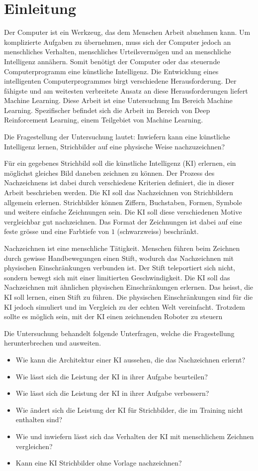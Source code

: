 
\chapter{Einleitung}\label{chap:einleit} Der Computer ist ein Werkzeug, das dem
Menschen Arbeit abnehmen kann. Um komplizierte Aufgaben zu übernehmen, muss sich
der Computer jedoch an menschliches Verhalten, menschliches Urteilsvermögen und
an menschliche Intelligenz annähern. Somit benötigt der Computer oder das
steuernde Computerprogramm eine künstliche Intelligenz. Die Entwicklung eines
intelligenten Computerprogrammes birgt verschiedene Herausforderung. Der
fähigste und am weitesten verbreitete Ansatz an diese Herausforderungen liefert
Machine Learning. Diese Arbeit ist eine Untersuchung Im Bereich Machine
Learning. Spezifischer befindet sich die Arbeit im Bereich von Deep Reinforcement
Learning, einem Teilgebiet von Machine Learning.
 
Die Fragestellung der Untersuchung lautet: Inwiefern kann eine künstliche
Intelligenz lernen, Strichbilder auf eine physische Weise nachzuzeichnen?

Für ein gegebenes Strichbild soll die künstliche Intelligenz (KI) erlernen, ein
möglichst gleiches Bild daneben zeichnen zu können. Der Prozess des
Nachzeichnens ist dabei durch verschiedene Kriterien definiert, die in dieser
Arbeit beschrieben werden. Die KI soll das Nachzeichnen von Strichbildern
allgemein erlernen. Strichbilder können Ziffern, Buchstaben, Formen, Symbole und
weitere einfache Zeichnungen sein. Die KI soll diese verschiedenen Motive
vergleichbar gut nachzeichnen. Das Format der Zeichnungen ist dabei auf eine
feste grösse und eine Farbtiefe von $1$ (schwarzweiss) beschränkt.
 
Nachzeichnen ist eine menschliche Tätigkeit. Menschen führen beim Zeichnen durch
gewisse Handbewegungen einen Stift, wodurch das Nachzeichnen mit physischen
Einschränkungen verbunden ist. Der Stift teleportiert sich nicht, sondern bewegt
sich mit einer limitierten Geschwindigkeit. Die KI soll das Nachzeichnen mit
ähnlichen physischen Einschränkungen erlernen. Das heisst, die KI soll lernen,
einen Stift zu führen. Die physischen Einschränkungen sind für die KI jedoch
simuliert und im Vergleich zu der echten Welt vereinfacht. Trotzdem sollte es
möglich sein, mit der KI einen zeichnenden Roboter zu steuern
 
Die Untersuchung behandelt folgende Unterfragen, welche die Fragestellung
herunterbrechen und ausweiten.
\begin{itemize}
   \item Wie kann die Architektur einer KI aussehen, die das Nachzeichnen erlernt?
   \item Wie lässt sich die Leistung der KI in ihrer Aufgabe beurteilen?
   \item Wie lässt sich die Leistung der KI in ihrer Aufgabe verbessern?
   \item Wie ändert sich die Leistung der KI für Strichbilder, die im Training nicht enthalten sind?
   \item Wie und inwiefern lässt sich das Verhalten der KI mit menschlichem Zeichnen vergleichen?
   \item Kann eine KI Strichbilder ohne Vorlage nachzeichnen?
\end{itemize}
